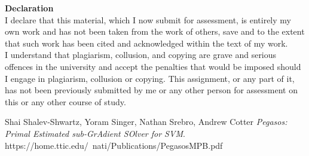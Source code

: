 \documentclass[a4paper]{article}
\begin{document}
\clearpage\null\newpage

\vspace*{1cm}

\textbf{Declaration}\\
I declare that this material, which I now submit for assessment, is entirely my own work and has not been taken from the work of others, save and to the extent that such work has been cited and acknowledged within the text of my work.\\
I understand that plagiarism, collusion, and copying are grave and serious offences in the university and accept the penalties that would be imposed should I engage in plagiarism, collusion or copying. This assignment, or any part of it, has not been previously submitted by me or any other person for assessment on this or any other course of study.\\
        

\newpage
\tableofcontents
\setlength{\parindent}{0pt}
\setlength{\parskip}{0.8em}


\clearpage\null\newpage


\newpage






\newpage
\begin{thebibliography}{unsrt}

    Shai Shalev-Shwartz, Yoram Singer, Nathan Srebro, Andrew Cotter \emph{Pegasos: Primal Estimated sub-GrAdient SOlver for SVM}. https://home.ttic.edu/~nati/Publications/PegasosMPB.pdf
    
\end{thebibliography}
\end{document}
